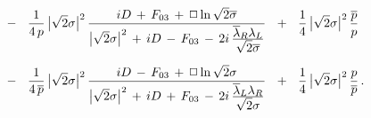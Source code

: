 \documentclass[epsfig,12pt]{article}
\newcommand{\ov}{\overline}
\begin{document}
\begin{align}
%
\notag
	&
		~~-~~  \frac{1}{4\, p}\, \big|\sqrt{2}\sigma\big|^2\,
			\frac{iD \,+\, F_{03} \,+\, \Box \ln \sqrt{2}\ov\sigma}
			{
				\big|\sqrt{2}\sigma\big|^2 \,+\, iD \,-\, F_{03} 
				\,-\, 2i\,\frac{\displaystyle \ov\lambda{}_R\lambda_L}{\displaystyle \sqrt{2}\ov\sigma}
			}
		~~+~~  \frac{1}{4}\, \big|\sqrt{2}\sigma\big|^2\, \frac{\ov p}{p}
	\\[2mm]
%
\notag
	&
		~~-~~  \frac{1}{4\, \ov p}\, \big|\sqrt{2}\sigma\big|^2\,
			\frac{iD \,-\, F_{03} \,+\, \Box \ln \sqrt{2}\sigma}
			{
				\big|\sqrt{2}\sigma\big|^2 \,+\, iD \,+\, F_{03} 
				\,-\, 2i\,\frac{\displaystyle \ov\lambda{}_L\lambda_R}{\displaystyle \sqrt{2}\sigma}
			}
		~~+~~  \frac{1}{4}\, \big|\sqrt{2}\sigma\big|^2\, \frac{p}{\ov p}
	\,.
\end{align}
\endgroup
\pagebreak                          %
\end{document}
